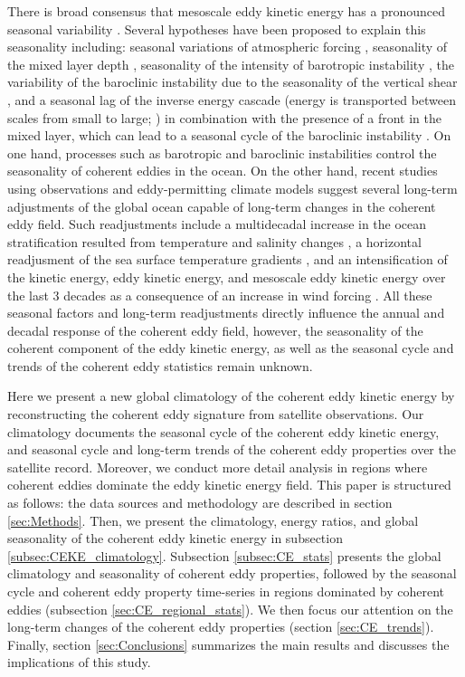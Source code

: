 \documentclass[draft,linenumbers]{agujournal2019}
\begin{document}
There is broad consensus that mesoscale eddy kinetic energy has a pronounced seasonal variability \citep{Uchida_Seasonality_2017,Kang_On_2017,Qiu_seasonal_2004, Qiu_seasonal_1999}. Several hypotheses have been proposed to explain this seasonality including: seasonal variations of atmospheric forcing \citep{Sasaki_seasonal_2014}, seasonality of the mixed layer depth \citep{Qiu_seasonal_2014,Callies_season_2015}, seasonality of the intensity of barotropic instability \citep{Qiu_seasonal_2004}, the variability of the baroclinic instability due to the seasonality of the vertical shear \citep{Qiu_seasonal_1999}, and a seasonal lag of the inverse energy cascade (energy is transported between scales from small to large; \citealp{Arbic_cascade_2013}) in combination with the presence of a front in the mixed layer, which can lead to a seasonal cycle of the baroclinic instability \citep{Qiu_seasonal_2014}. On one hand, processes such as barotropic and baroclinic instabilities control the seasonality of coherent eddies in the ocean. 
On the other hand, recent studies using observations and eddy-permitting climate models suggest several long-term adjustments of the global ocean capable of long-term changes in the coherent eddy field. 
Such readjustments include a multidecadal increase in the ocean stratification resulted from temperature and salinity changes \citep{Li_stratification_2020}, a horizontal readjusment of the sea surface temperature gradients \citep{Ruela_SST_trends_2020,Bouali_SST_grad_trends_2017,Cane_SST_trends_1997}, and an intensification of the kinetic energy, eddy kinetic energy, and mesoscale eddy kinetic energy over the last 3 decades as a consequence of an increase in wind forcing \citep{Hu_acceleration_2020,Wunsch_speeding_2020,Martinez_Kinetic_2021}. All these seasonal factors and long-term readjustments directly influence the annual and decadal response of the coherent eddy field, however, the seasonality of the coherent component of the eddy kinetic energy, as well as the seasonal cycle and trends of the coherent eddy statistics remain unknown.

Here we present a new global climatology of the coherent eddy kinetic energy by reconstructing the coherent eddy signature from satellite observations. Our climatology documents the seasonal cycle of the coherent eddy kinetic energy, and seasonal cycle and long-term trends of the coherent eddy properties over the satellite record. 
Moreover, we conduct more detail analysis in regions where coherent eddies dominate the eddy kinetic energy field. 
This paper is structured as follows:  the data sources and methodology are described in section \ref{sec:Methods}.
Then, we present the climatology, energy ratios, and global seasonality of the coherent eddy kinetic energy in subsection \ref{subsec:CEKE_climatology}. 
Subsection \ref{subsec:CE_stats} presents the global climatology and seasonality of coherent eddy properties, followed by the seasonal cycle and coherent eddy property time-series in regions dominated by coherent eddies (subsection \ref{sec:CE_regional_stats}). 
We then focus our attention on the long-term changes of the coherent eddy properties (section \ref{sec:CE_trends}). 
Finally, section \ref{sec:Conclusions} summarizes the main results and discusses the implications of this study.
\end{document}
